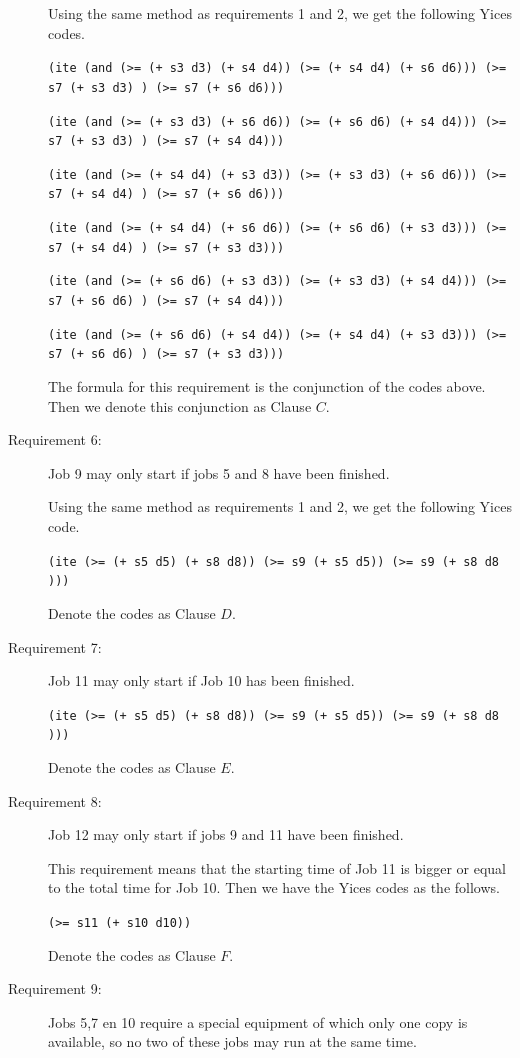 \documentclass[11pt]{article}
\begin{document}
\begin{description}
  Using the same method as requirements 1 and 2, we get the following Yices codes.
  \begin{center}
  {\tt (ite (and (>= (+ s3 d3) (+ s4 d4)) (>= (+ s4 d4) (+ s6 d6))) (>= s7 (+ s3 d3) ) (>= s7 (+ s6 d6)))}

  {\tt (ite (and (>= (+ s3 d3) (+ s6 d6)) (>= (+ s6 d6) (+ s4 d4))) (>= s7 (+ s3 d3) ) (>= s7 (+ s4 d4)))}

  {\tt (ite (and (>= (+ s4 d4) (+ s3 d3)) (>= (+ s3 d3) (+ s6 d6))) (>= s7 (+ s4 d4) ) (>= s7 (+ s6 d6)))}

  {\tt (ite (and (>= (+ s4 d4) (+ s6 d6)) (>= (+ s6 d6) (+ s3 d3))) (>= s7 (+ s4 d4) ) (>= s7 (+ s3 d3)))}

  {\tt (ite (and (>= (+ s6 d6) (+ s3 d3)) (>= (+ s3 d3) (+ s4 d4))) (>= s7 (+ s6 d6) ) (>= s7 (+ s4 d4)))}

  {\tt (ite (and (>= (+ s6 d6) (+ s4 d4)) (>= (+ s4 d4) (+ s3 d3))) (>= s7 (+ s6 d6) ) (>= s7 (+ s3 d3)))}
  \end{center}
  The formula for this requirement is the conjunction of the codes above. Then we denote this conjunction as Clause $C$.
  \item[Requirement 6:] Job 9 may only start if jobs 5 and 8 have been finished.

  Using the same method as requirements 1 and 2, we get the following Yices code.
  \begin{center}
  {\tt (ite (>= (+ s5 d5) (+ s8 d8)) (>= s9 (+ s5 d5)) (>= s9 (+ s8 d8 )))}
  \end{center}
  Denote the codes as Clause $D$.
  \item[Requirement 7:] Job 11 may only start if Job 10 has been finished.

  \begin{center}
  {\tt (ite (>= (+ s5 d5) (+ s8 d8)) (>= s9 (+ s5 d5)) (>= s9 (+ s8 d8 )))}
  \end{center}
  Denote the codes as Clause $E$.
  \item[Requirement 8:] Job 12 may only start if jobs 9 and 11 have been finished.

  This requirement means that the starting time of Job 11 is bigger or equal to the total time for Job 10.
  Then we have the Yices codes as the follows.
  \begin{center}
  {\tt (>= s11 (+ s10 d10))}
  \end{center}
  Denote the codes as Clause $F$.
  \item[Requirement 9:] Jobs 5,7 en 10 require a special equipment of which only one copy is available, so no two of these jobs may run at the same time.


\end{description}
\end{document}
